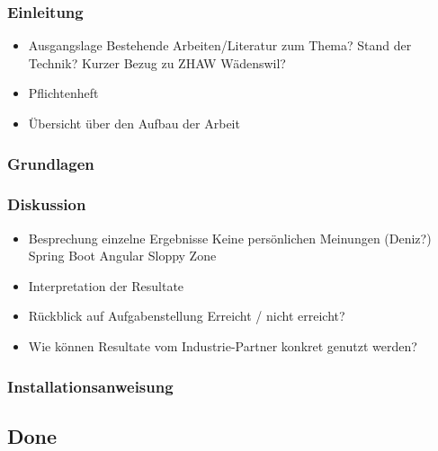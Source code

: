 \documentclass[../main.tex]{subfiles}
\begin{document}
	\subsubsection{Einleitung}
	\begin{itemize}
		\item Ausgangslage
		\subitem Bestehende Arbeiten/Literatur zum Thema?
		\subitem Stand der Technik?
		\subitem Kurzer Bezug zu ZHAW Wädenswil?
		
		\item Pflichtenheft
		\item Übersicht über den Aufbau  der Arbeit
	\end{itemize}
	
	\subsubsection{Grundlagen}
	
	\subsubsection{Diskussion}
	\begin{itemize}
		\item Besprechung einzelne Ergebnisse
		\subitem Keine persönlichen Meinungen (Deniz?)
		\subitem Spring Boot
		\subitem Angular
		\subitem Sloppy Zone
		
		\item Interpretation der Resultate
		
		\item Rückblick auf Aufgabenstellung
		\subitem Erreicht / nicht erreicht?
		
		\item Wie können Resultate vom Industrie-Partner konkret genutzt werden?
	\end{itemize}
	
	\subsubsection{Installationsanweisung}
	\subsection{Done}

	

	

	

	
\end{document}
